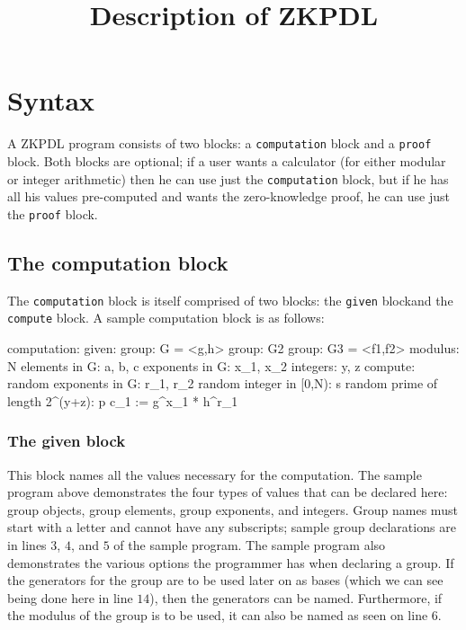 \documentclass[letterpaper,11pt]{article}
\title{Description of ZKPDL}
\begin{document}
\maketitle







\section{Syntax}\label{sec:syntax}

A ZKPDL program consists of two blocks: a \verb#computation# block and a
\verb#proof# block.
Both blocks are optional; if a user wants a calculator (for either modular or
integer arithmetic) then he can use just the \verb#computation# block, but if he 
has all
his values pre-computed and wants the zero-knowledge proof, he can use just
the \verb#proof# block.

\subsection{The computation block}\label{sec:computation}

The \verb#computation# block is itself comprised of two blocks: the 
\verb#given# blockand the \verb#compute# block.  A sample computation block is
as follows:

\begin{ZKPVerbatim}
computation:
	given: 
		group: G = <g,h>
		group: G2
		group: G3 = <f1,f2>
			modulus: N
		elements in G: a, b, c
		exponents in G: x_1, x_2
		integers: y, z
	compute:
		random exponents in G: r_1, r_2
		random integer in [0,N): s
		random prime of length 2^(y+z): p
		c_1 := g^x_1 * h^r_1
\end{ZKPVerbatim}

\subsubsection{The given block}\label{sec:given}

This block names all the values necessary for the computation.  The sample
program above demonstrates the four types of values that can be declared here: 
group objects, group elements, group exponents, and integers.  Group names
must start with a letter and cannot have any subscripts; sample group
declarations are in lines $3$, $4$, and $5$ of the sample program.  The sample
program also demonstrates the various options the programmer has when
declaring a group.  If the generators for the group are to be used later on as
bases (which we can see being done here in line $14$), then the generators can
be named.  Furthermore, if the modulus of the group is to be used, it can also
be named as seen on line $6$.  
\end{document}
